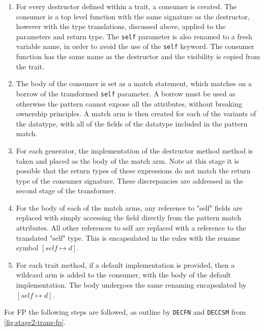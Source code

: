\documentclass[ oneside,%
                    author={James Elgar},
                    degree={MEng},
                     title={Bidirectional transformer between functional and \\ object-oriented programming in Rust},
                  subtitle={}]{dissertation}
\begin{document}
\begin{enumerate}
    \item For every destructor defined within a trait, a consumer is created. The consumer is a top level function with the same signature as the destructor, however with the type translations, discussed above, applied to the parameters and return type. The \verb|self| parameter is also renamed to a fresh variable name, in order to avoid the use of the \verb|self| keyword. The consumer function has the same name as the destructor and the visibility is copied from the trait.
    \item The body of the consumer is set as a match statement, which matches on a borrow of the transformed \verb|self| parameter. A borrow must be used as otherwise the pattern cannot expose all the attributes, without breaking ownership principles. A match arm is then created for each of the variants of the datatype, with all of the fields of the datatype included in the pattern match.
    \item For each generator, the implementation of the destructor method method is taken and placed as the body of the match arm. Note at this stage it is possible that the return types of these expressions do not match the return type of the consumer signature. These discrepancies are addressed in the second stage of the transformer.
    \item For the body of each of the match arms, any reference to "self" fields are replaced with simply accessing the field directly from the pattern match attributes. All other references to self are replaced with a reference to the translated "self" type. This is encapsulated in the rules with the rename symbol $[self \mapsto d]$. 
    \item For each trait method, if a default implementation is provided, then a wildcard arm is added to the consumer, with the body of the default implementation. The body undergoes the same renaming encapsulated by $[self \mapsto d]$.
\end{enumerate}

For FP  the following steps are followed, as outline by \verb|DECFN| and \verb|DECCSM| from \autoref{fig:stage2-trans-fp}.
\end{document}
